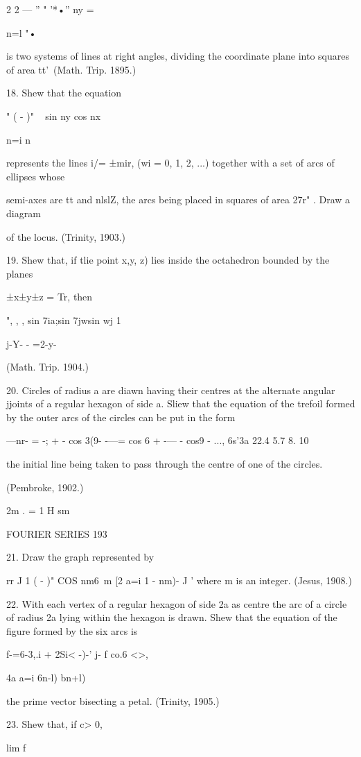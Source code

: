 {2 2 — '' " '*•'' ny =

n=l "•

is two systems of lines at right angles, dividing the coordinate plane
into squares of area tt'\ (Math. Trip. 1895.)

18. Shew that the equation

" ( - )" ~ sin ny cos nx \

n=i n ~

represents the lines i/= ±mir, (wi = 0, 1, 2, ...) together with a set
of arcs of ellipses whose

semi-axes are tt and nlslZ, the arcs being placed in squares of area
27r" . Draw a diagram

of the locus. (Trinity, 1903.)

19. Shew that, if tlie point x,y, z) lies inside the octahedron
bounded by the planes

±x±y±z = Tr, then

", , , sin 7ia;sin 7jwsin wj 1

 j-Y- - =2-y-

(Math. Trip. 1904.)

20. Circles of radius a are diawn having their centres at the
alternate angular jjoints of a regular hexagon of side a. Sliew that
the equation of the trefoil formed by the outer arcs of the circles
can be put in the form

—nr- = -; + - cos 3(9- -—= cos 6 + -— - cos9 - ..., 6s'3a 22.4 5.7 8.
10

the initial line being taken to pass through the centre of one of the
circles.

(Pembroke, 1902.)

2m . = 1 H sm

FOURIER SERIES 193

21. Draw the graph represented by

rr J 1 ( - )" COS nm6\ m [2 a=i 1 - nm)- J ' where m is an integer.
(Jesus, 1908.)

22. With each vertex of a regular hexagon of side 2a as centre the arc
of a circle of radius 2a lying within the hexagon is drawn. Shew that
the equation of the figure formed by the six arcs is

f-=6-3,.i + 2Si< -)-' j- f co.6 <>,

4a a=i 6n-l) bn+l)

the prime vector bisecting a petal. (Trinity, 1905.)

23. Shew that, if c> 0,

lim f

}

